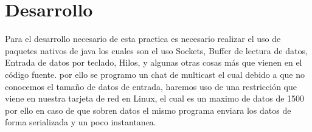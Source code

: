 \documentclass[10pt,executivepaper]{article}
\begin{document}
\begin{center}
	\par{}
\par{}
\par{}
\par\vspace{2cm}{
	Ultima fecha modificado: \today
}
\end{center}

\clearpage
\section{Desarrollo}
Para el desarrollo necesario de esta practica es necesario realizar el uso de paquetes nativos de java los cuales son el uso Sockets, Buffer de lectura de datos, Entrada de datos por teclado, Hilos, y algunas otras cosas más que vienen en el código fuente. por ello se programo un chat de multicast el cual debido a que no conocemos el tamaño de datos de entrada, haremos uso de una restricción que viene en nuestra tarjeta de red en Linux, el cual es un maximo de datos de 1500 por ello en caso de que sobren datos el mismo programa enviara los datos de forma serializada y un poco instantanea.
\end{document}
